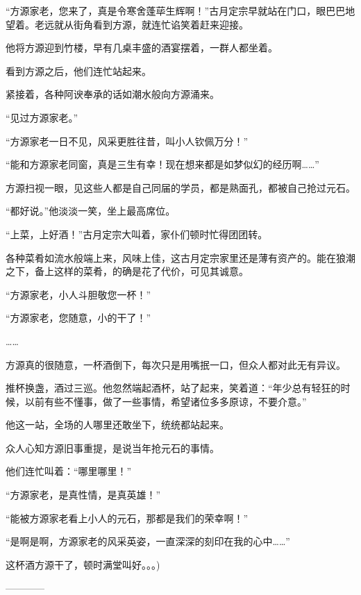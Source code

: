 \begin{this_body}
“方源家老，您来了，真是令寒舍蓬荜生辉啊！”古月定宗早就站在门口，眼巴巴地望着。老远就从街角看到方源，就连忙谄笑着赶来迎接。

他将方源迎到竹楼，早有几桌丰盛的酒宴摆着，一群人都坐着。

看到方源之后，他们连忙站起来。

紧接着，各种阿谀奉承的话如潮水般向方源涌来。

“见过方源家老。”

“方源家老一日不见，风采更胜往昔，叫小人钦佩万分！”

“能和方源家老同窗，真是三生有幸！现在想来都是如梦似幻的经历啊……”

方源扫视一眼，见这些人都是自己同届的学员，都是熟面孔，都被自己抢过元石。

“都好说。”他淡淡一笑，坐上最高席位。

“上菜，上好酒！”古月定宗大叫着，家仆们顿时忙得团团转。

各种菜肴如流水般端上来，风味上佳，这古月定宗家里还是薄有资产的。能在狼潮之下，备上这样的菜肴，的确是花了代价，可见其诚意。

“方源家老，小人斗胆敬您一杯！”

“方源家老，您随意，小的干了！”

……

方源真的很随意，一杯酒倒下，每次只是用嘴抿一口，但众人都对此无有异议。

推杯换盏，酒过三巡。他忽然端起酒杯，站了起来，笑着道：“年少总有轻狂的时候，以前有些不懂事，做了一些事情，希望诸位多多原谅，不要介意。”

他这一站，全场的人哪里还敢坐下，统统都站起来。

众人心知方源旧事重提，是说当年抢元石的事情。

他们连忙叫着：“哪里哪里！”

“方源家老，是真性情，是真英雄！”

“能被方源家老看上小人的元石，那都是我们的荣幸啊！”

“是啊是啊，方源家老的风采英姿，一直深深的刻印在我的心中……”

这杯酒方源干了，顿时满堂叫好。。。)

------------

\end{this_body}

